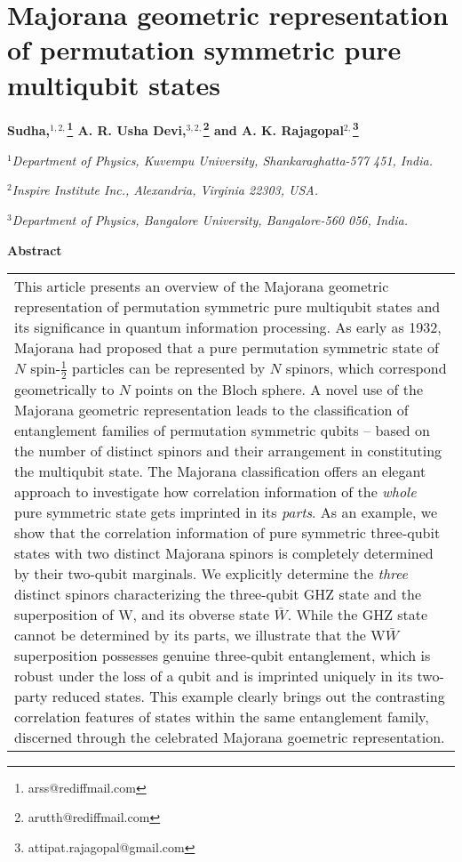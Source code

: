 \chapter{Majorana geometric representation of permutation symmetric pure multiqubit states} 

\renewcommand{\thefootnote}{\fnsymbol{footnote}}
\begin{center}
\textbf{Sudha,$^{1,2,}$\footnote{arss@rediffmail.com} A. R. Usha Devi,$^{3,2,}$\footnote{arutth@rediffmail.com} and A. K. Rajagopal$^{2,}$\footnote{attipat.rajagopal@gmail.com}}

\textit{$^{1}$Department of Physics, Kuvempu University, Shankaraghatta-577 451, India.}

\textit{$^{2}$Inspire Institute Inc., Alexandria, Virginia 22303, USA.}

\textit{$^{3}$Department of Physics, Bangalore University, Bangalore-560 056, India.} 
\end{center}

\medskip
\begin{center}
\textbf{Abstract}
\end{center}
\medskip

\begin{longtable}{p{8cm}}
This article presents an overview of the Majorana geometric representation of permutation symmetric  pure multiqubit states and its significance in quantum information processing. As early as 1932, Majorana had proposed that a pure permutation symmetric state of $N$ spin-$\frac{1}{2}$ particles can be represented by $N$ spinors, which correspond geometrically to $N$ points on the Bloch sphere. A novel use of the Majorana geometric representation leads  to the classification of entanglement families of permutation symmetric qubits -- based on the number of distinct  spinors  and their arrangement in constituting the multiqubit state. The Majorana classification offers an elegant approach to investigate how correlation information of the {\em whole}  pure symmetric state gets imprinted in its {\em parts}. As an example, we show that the correlation information of pure symmetric three-qubit states with two distinct Majorana spinors is completely determined by their two-qubit marginals. We explicitly determine the {\emph {three}} distinct spinors characterizing the three-qubit GHZ state and the superposition of W, and its obverse state $\bar W$. While the GHZ state cannot be determined by its parts, we illustrate that the W$\bar W$ superposition possesses genuine three-qubit entanglement, which is robust under the loss of a qubit and is imprinted uniquely in its two-party reduced states. This example clearly brings out the contrasting correlation features of states within the same entanglement family, discerned through the celebrated Majorana goemetric representation.  
\end{longtable}


